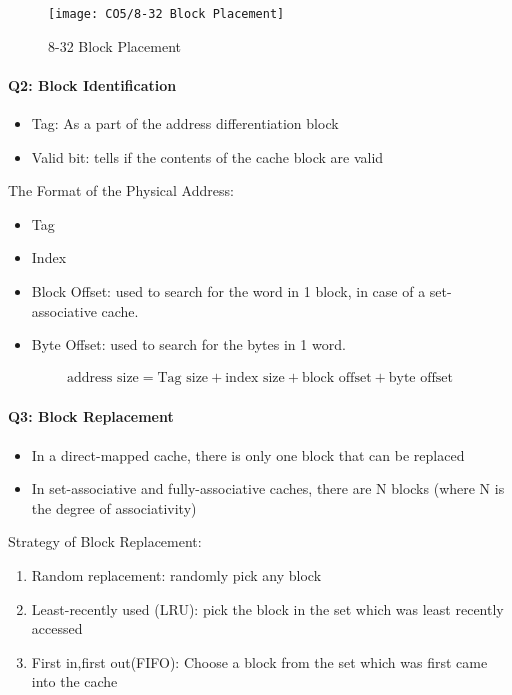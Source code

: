 \begin{figure}[!htb]
    \centering
    \texttt{[image: CO5/8-32 Block Placement]}
    \caption{8-32 Block Placement}
\end{figure}

\paragraph{Q2: Block Identification}
\begin{itemize}
    \item Tag: As a part of the address differentiation block
    \item Valid bit:  tells if the contents of the cache block are valid
\end{itemize}

The Format of the Physical Address: 
\begin{itemize}
    \item Tag
    \item Index
    \item Block Offset: {\small used to search for the word in 1 block, in case of a set-associative cache.}
    \item Byte Offset: {\small used to search for the bytes in 1 word.}
\end{itemize}
{\small
    \begin{align*}
        \text{address size}=\text{Tag size}+\text{index size}+\text{block offset}+\text{byte offset}
    \end{align*}
}


\paragraph{Q3: Block Replacement}
\begin{itemize}
    \item In a direct-mapped cache, there is only one block that can be replaced
    \item In set-associative and fully-associative caches, there are N blocks (where N is the degree of associativity)
\end{itemize}

Strategy of Block Replacement:
\begin{enumerate}
    \item Random replacement: {\small randomly pick any block}
    \item Least-recently used (LRU): {\small pick the block in the set which was least recently accessed}
    \item First in,first out(FIFO): {\small Choose a block from the set which was first came into the cache}
\end{enumerate}

